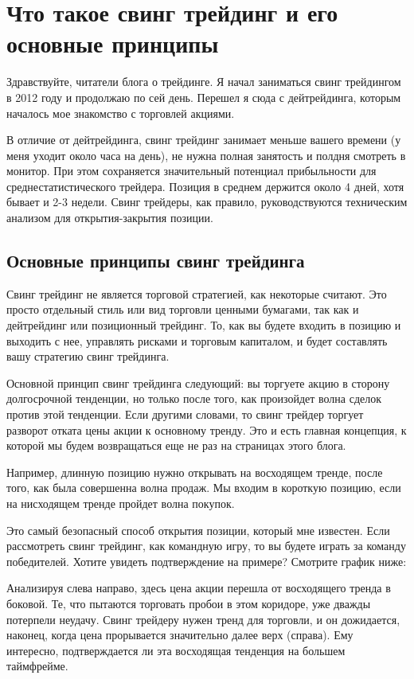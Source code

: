 \documentclass{book}
\begin{document}
\section{Что такое свинг трейдинг и его основные принципы}

Здравствуйте, читатели блога о трейдинге. Я начал заниматься свинг трейдингом в 2012 году и продолжаю по сей день. Перешел я сюда с дейтрейдинга, которым началось мое знакомство с торговлей акциями.

В отличие от дейтрейдинга, свинг трейдинг занимает меньше вашего времени (у меня уходит около часа на день), не нужна полная занятость и полдня смотреть в монитор. При этом сохраняется значительный потенциал прибыльности для среднестатистического трейдера. Позиция в среднем держится около 4 дней, хотя бывает и 2-3 недели. Свинг трейдеры, как правило, руководствуются техническим анализом для открытия-закрытия позиции.

\subsection{Основные принципы свинг трейдинга}

Свинг трейдинг не является торговой стратегией, как некоторые считают. Это просто отдельный стиль или вид торговли ценными бумагами, так как и дейтрейдинг или позиционный трейдинг. То, как вы будете входить в позицию и выходить с нее, управлять рисками и торговым капиталом, и будет составлять вашу стратегию свинг трейдинга.

Основной принцип свинг трейдинга следующий: вы торгуете акцию в сторону долгосрочной тенденции, но только после того, как произойдет волна сделок против этой тенденции. Если другими словами, то свинг трейдер торгует разворот отката цены акции к основному тренду. Это и есть главная концепция, к которой мы будем возвращаться еще не раз на страницах этого блога.

Например, длинную позицию нужно открывать на восходящем тренде, после того, как была совершенна волна продаж. Мы входим в короткую позицию, если на нисходящем тренде пройдет волна покупок.

Это самый безопасный способ открытия позиции, который мне известен. Если рассмотреть свинг трейдинг, как командную игру, то вы будете играть за команду победителей. Хотите увидеть подтверждение на примере? Смотрите график ниже:


Анализируя слева направо, здесь цена акции перешла от восходящего тренда в боковой. Те, что пытаются торговать пробои в этом коридоре, уже дважды потерпели неудачу. Свинг трейдеру нужен тренд для торговли, и он дожидается, наконец, когда цена прорывается значительно далее верх (справа). Ему интересно, подтверждается ли эта восходящая тенденция на большем таймфрейме.
\end{document}
